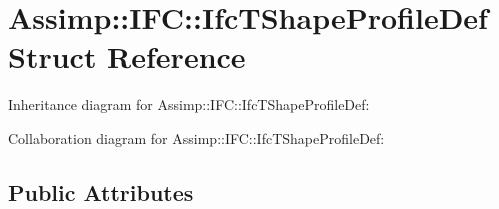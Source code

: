 \hypertarget{struct_assimp_1_1_i_f_c_1_1_ifc_t_shape_profile_def}{\section{Assimp\+:\+:I\+F\+C\+:\+:Ifc\+T\+Shape\+Profile\+Def Struct Reference}
\label{struct_assimp_1_1_i_f_c_1_1_ifc_t_shape_profile_def}
}


Inheritance diagram for Assimp\+:\+:I\+F\+C\+:\+:Ifc\+T\+Shape\+Profile\+Def\+:


Collaboration diagram for Assimp\+:\+:I\+F\+C\+:\+:Ifc\+T\+Shape\+Profile\+Def\+:
\subsection*{Public Attributes}
